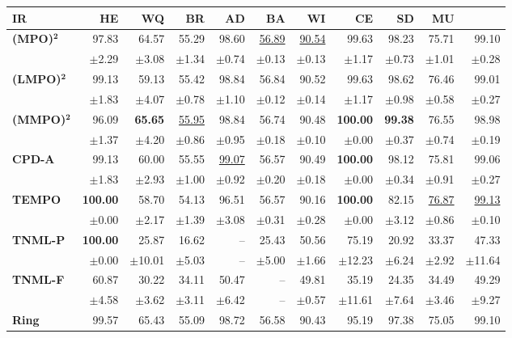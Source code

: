 \begin{table}[!htbp]
\centering
\scriptsize
\begin{tabular}{lrrrrrrrrrr}
\toprule
IR & HE & WQ & BR & AD & BA & WI & CE & SD & MU \\
\midrule
\textbf{(MPO)}$\bm{^2}$ & 97.83 & 64.57 & 55.29 & 98.60 & \underline{56.89} & \underline{90.54} & 99.63 & 98.23 & 75.71 & 99.10 \\
 & $\pm$2.29 & $\pm$3.08 & $\pm$1.34 & $\pm$0.74 & $\pm$0.13 & $\pm$0.13 & $\pm$1.17 & $\pm$0.73 & $\pm$1.01 & $\pm$0.28 \\
\midrule
\textbf{(LMPO)}$\bm{^2}$ & 99.13 & 59.13 & 55.42 & 98.84 & 56.84 & 90.52 & 99.63 & 98.62 & 76.46 & 99.01 \\
 & $\pm$1.83 & $\pm$4.07 & $\pm$0.78 & $\pm$1.10 & $\pm$0.12 & $\pm$0.14 & $\pm$1.17 & $\pm$0.98 & $\pm$0.58 & $\pm$0.27 \\
\midrule
\textbf{(MMPO)}$\bm{^2}$ & 96.09 & \textbf{65.65} & \underline{55.95} & 98.84 & 56.74 & 90.48 & \textbf{100.00} & \textbf{99.38} & 76.55 & 98.98 \\
 & $\pm$1.37 & $\pm$4.20 & $\pm$0.86 & $\pm$0.95 & $\pm$0.18 & $\pm$0.10 & $\pm$0.00 & $\pm$0.37 & $\pm$0.74 & $\pm$0.19 \\
\midrule
\textbf{CPD-A} & 99.13 & 60.00 & 55.55 & \underline{99.07} & 56.57 & 90.49 & \textbf{100.00} & 98.12 & 75.81 & 99.06 \\
 & $\pm$1.83 & $\pm$2.93 & $\pm$1.00 & $\pm$0.92 & $\pm$0.20 & $\pm$0.18 & $\pm$0.00 & $\pm$0.34 & $\pm$0.91 & $\pm$0.27 \\
\midrule
\textbf{TEMPO} & \textbf{100.00} & 58.70 & 54.13 & 96.51 & 56.57 & 90.16 & \textbf{100.00} & 82.15 & \underline{76.87} & \underline{99.13} \\
 & $\pm$0.00 & $\pm$2.17 & $\pm$1.39 & $\pm$3.08 & $\pm$0.31 & $\pm$0.28 & $\pm$0.00 & $\pm$3.12 & $\pm$0.86 & $\pm$0.10 \\
\midrule
\textbf{TNML-P} & \textbf{100.00} & 25.87 & 16.62 & -- & 25.43 & 50.56 & 75.19 & 20.92 & 33.37 & 47.33 \\
 & $\pm$0.00 & $\pm$10.01 & $\pm$5.03 & -- & $\pm$5.00 & $\pm$1.66 & $\pm$12.23 & $\pm$6.24 & $\pm$2.92 & $\pm$11.64 \\
\midrule
\textbf{TNML-F} & 60.87 & 30.22 & 34.11 & 50.47 & -- & 49.81 & 35.19 & 24.35 & 34.49 & 49.29 \\
 & $\pm$4.58 & $\pm$3.62 & $\pm$3.11 & $\pm$6.42 & -- & $\pm$0.57 & $\pm$11.61 & $\pm$7.64 & $\pm$3.46 & $\pm$9.27 \\
\midrule
\textbf{Ring} & 99.57 & 65.43 & 55.09 & 98.72 & 56.58 & 90.43 & 95.19 & 97.38 & 75.05 & 99.10 \\

\end{tabular}
\end{table}

